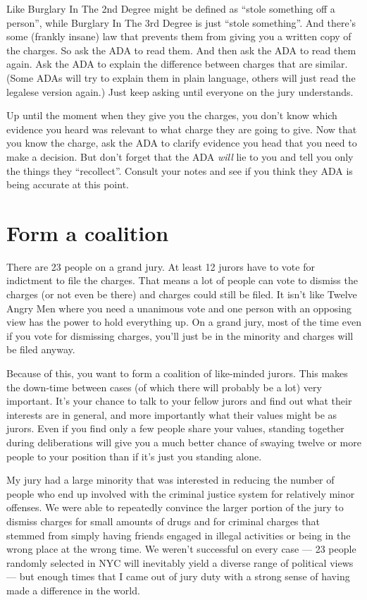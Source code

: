 \documentclass[letterpaper]{article}
\begin{document}
Like Burglary In The 2nd Degree might be defined as ``stole something off a person'', while Burglary In The 3rd Degree is just ``stole something''. 
And there's some (frankly insane) law that prevents them from giving you a written copy of the charges. 
So ask the ADA to read them. 
And then ask the ADA to read them again. 
Ask the ADA to explain the difference between charges that are similar. 
(Some ADAs will try to explain them in plain language, others will just read the legalese version again.) 
Just keep asking until everyone on the jury understands.

Up until the moment when they give you the charges, you don't know which evidence you heard was relevant to what charge they are going to give. 
Now that you know the charge, ask the ADA to clarify evidence you head that you need to make a decision. 
But don't forget that the ADA \emph{will} lie to you and tell you only the things they ``recollect''.  
Consult your notes and see if you think they ADA is being accurate at this point.

\section*{Form a coalition}
There are 23 people on a grand jury. 
At least 12 jurors have to vote for indictment to file the charges. 
That means a lot of people can vote to dismiss the charges (or not even be there) and charges could still be filed.
It isn't like Twelve Angry Men where you need a unanimous vote and one person with an opposing view has the power to hold everything up.
On a grand jury, most of the time even if you vote for dismissing charges, you'll just be in the minority and charges will be filed anyway.

Because of this, you want to form a coalition of like-minded jurors.
This makes the down-time between cases (of which there will probably be a lot) very important.
It's your chance to talk to your fellow jurors and find out what their interests are in general, and more importantly what their values might be as jurors.
Even if you find only a few people share your values, standing together during deliberations will give you a much better chance of swaying twelve or more people to your position than if it's just you standing alone.

My jury had a large minority that was interested in reducing the number of people who end up involved with the criminal justice system for relatively minor offenses.
We were able to repeatedly convince the larger portion of the jury to dismiss charges for small amounts of drugs and for criminal charges that stemmed from simply having friends engaged in illegal activities or being in the wrong place at the wrong time.
We weren't successful on every case --- 23 people randomly selected in NYC will inevitably yield a diverse range of political views --- but enough times that I came out of jury duty with a strong sense of having made a difference in the world.
\end{document}
